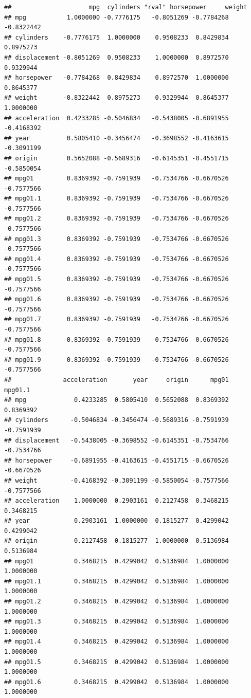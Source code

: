 \documentclass[]{book}
\begin{document}
\begin{verbatim}
##                     mpg  cylinders "rval" horsepower     weight
## mpg           1.0000000 -0.7776175   -0.8051269 -0.7784268 -0.8322442
## cylinders    -0.7776175  1.0000000    0.9508233  0.8429834  0.8975273
## displacement -0.8051269  0.9508233    1.0000000  0.8972570  0.9329944
## horsepower   -0.7784268  0.8429834    0.8972570  1.0000000  0.8645377
## weight       -0.8322442  0.8975273    0.9329944  0.8645377  1.0000000
## acceleration  0.4233285 -0.5046834   -0.5438005 -0.6891955 -0.4168392
## year          0.5805410 -0.3456474   -0.3698552 -0.4163615 -0.3091199
## origin        0.5652088 -0.5689316   -0.6145351 -0.4551715 -0.5850054
## mpg01         0.8369392 -0.7591939   -0.7534766 -0.6670526 -0.7577566
## mpg01.1       0.8369392 -0.7591939   -0.7534766 -0.6670526 -0.7577566
## mpg01.2       0.8369392 -0.7591939   -0.7534766 -0.6670526 -0.7577566
## mpg01.3       0.8369392 -0.7591939   -0.7534766 -0.6670526 -0.7577566
## mpg01.4       0.8369392 -0.7591939   -0.7534766 -0.6670526 -0.7577566
## mpg01.5       0.8369392 -0.7591939   -0.7534766 -0.6670526 -0.7577566
## mpg01.6       0.8369392 -0.7591939   -0.7534766 -0.6670526 -0.7577566
## mpg01.7       0.8369392 -0.7591939   -0.7534766 -0.6670526 -0.7577566
## mpg01.8       0.8369392 -0.7591939   -0.7534766 -0.6670526 -0.7577566
## mpg01.9       0.8369392 -0.7591939   -0.7534766 -0.6670526 -0.7577566
##              acceleration       year     origin      mpg01    mpg01.1
## mpg             0.4233285  0.5805410  0.5652088  0.8369392  0.8369392
## cylinders      -0.5046834 -0.3456474 -0.5689316 -0.7591939 -0.7591939
## displacement   -0.5438005 -0.3698552 -0.6145351 -0.7534766 -0.7534766
## horsepower     -0.6891955 -0.4163615 -0.4551715 -0.6670526 -0.6670526
## weight         -0.4168392 -0.3091199 -0.5850054 -0.7577566 -0.7577566
## acceleration    1.0000000  0.2903161  0.2127458  0.3468215  0.3468215
## year            0.2903161  1.0000000  0.1815277  0.4299042  0.4299042
## origin          0.2127458  0.1815277  1.0000000  0.5136984  0.5136984
## mpg01           0.3468215  0.4299042  0.5136984  1.0000000  1.0000000
## mpg01.1         0.3468215  0.4299042  0.5136984  1.0000000  1.0000000
## mpg01.2         0.3468215  0.4299042  0.5136984  1.0000000  1.0000000
## mpg01.3         0.3468215  0.4299042  0.5136984  1.0000000  1.0000000
## mpg01.4         0.3468215  0.4299042  0.5136984  1.0000000  1.0000000
## mpg01.5         0.3468215  0.4299042  0.5136984  1.0000000  1.0000000
## mpg01.6         0.3468215  0.4299042  0.5136984  1.0000000  1.0000000

\end{verbatim}
\end{document}
